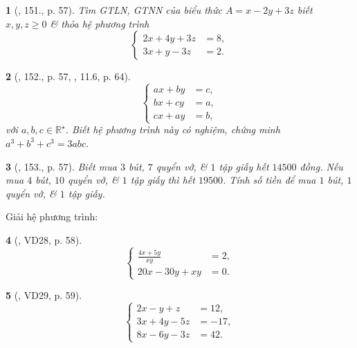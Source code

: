 \documentclass{article}
\newtheorem{baitoan}{}
\begin{document}
\begin{baitoan}[\cite{Tuyen_Toan_9_old}, 151., p. 57]
	Tìm {\rm GTLN, GTNN} của biểu thức $A = x - 2y + 3z$ biết $x,y,z\ge0$ \& thỏa hệ phương trình
	\begin{equation*}
		\left\{\begin{split}
			2x + 4y + 3z &= 8,\\
			3x + y - 3z &= 2.
		\end{split}\right.
	\end{equation*}
\end{baitoan}

\begin{baitoan}[\cite{Tuyen_Toan_9_old}, 152., p. 57, \cite{TLCT_THCS_Toan_9_dai_so}, 11.6, p. 64]
	\begin{equation*}
		\left\{\begin{split}
			ax + by &= c,\\
			bx + cy &= a,\\
			cx + ay &= b,
		\end{split}\right.
	\end{equation*}
	với $a,b,c\in\mathbb{R}^\star$. Biết hệ phương trình này có nghiệm, chứng minh $a^3 + b^3 + c^3 = 3abc$.
\end{baitoan}

\begin{baitoan}[\cite{Tuyen_Toan_9_old}, 153., p. 57]
	Biết mua $3$ bút, $7$ quyển vở, \& $1$ tập giấy hết $14500$ đồng. Nếu mua $4$ bút, $10$ quyển vở, \& $1$ tập giấy thì hết $19500$. Tính số tiền để mua $1$ bút, $1$ quyển vở, \& $1$ tập giấy.
\end{baitoan}
Giải hệ phương trình:

\begin{baitoan}[\cite{Tuyen_Toan_9_old}, VD28, p. 58]
	\begin{equation*}
		\left\{\begin{split}
			\frac{4x + 5y}{xy} &= 2,\\
			20x - 30y + xy &= 0.
		\end{split}\right.
	\end{equation*}
\end{baitoan}

\begin{baitoan}[\cite{Tuyen_Toan_9_old}, VD29, p. 59]
	\begin{equation*}
		\left\{\begin{split}
			2x - y + z &= 12,\\
			3x + 4y - 5z &= -17,\\
			8x - 6y - 3z &= 42.
		\end{split}\right.
	\end{equation*}
\end{baitoan}
\end{document}
